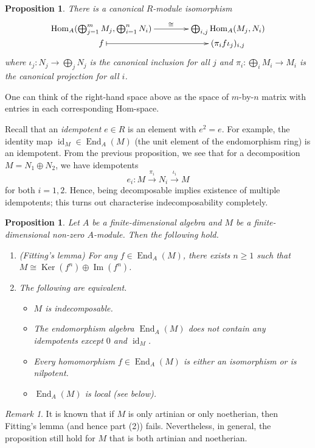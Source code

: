\documentclass[11pt,a4paper]{article}
\numberwithin{equation}{section}
\theoremstyle{all}
\newtheorem{proposition}[theorem]{Proposition}
\theoremstyle{remark}
\newtheorem{remark}[theorem]{Remark}
\newcommand{\id}{\operatorname{id}}
\newcommand{\Hom}{\operatorname{Hom}\nolimits}
\newcommand{\End}{\operatorname{End}\nolimits}
\renewcommand{\Im}{\operatorname{Im}\nolimits}
\newcommand{\Ker}{\operatorname{Ker}\nolimits}
\newcommand{\defn}[1]{\textsl{\color{darkblue} #1}}
\begin{document}
\begin{proposition}\label{prop:hom commute direct sum}
There is a canonical $R$-module isomorphism
\[
\xymatrix@C=40pt@R=0pt{\Hom_A(\bigoplus_{j=1}^m M_j, \bigoplus_{i=1}^n N_i) \ar[r]^(.55){\cong}& \bigoplus_{i,j}\Hom_A(M_j,N_i)\\
f \ar@{|->}[r]& (\pi_i f\iota_j)_{i,j}
}
\]
where $\iota_j:N_j\to \bigoplus_j N_j$ is the canonical inclusion for all $j$ and $\pi_i:\bigoplus_iM_i \to M_i$ is the canonical projection for all $i$.
\end{proposition}

One can think of the right-hand space above as the space of $m$-by-$n$ matrix with entries in each corresponding Hom-space.

Recall that an \defn{idempotent} $e\in R$ is an element with $e^2=e$.
For example, the identity map $\id_M\in \End_A(M)$ (the unit element of the endomorphism ring) is an idempotent. 
From the previous proposition, we see that for a decomposition $M=N_1\oplus N_2$, we have idempotents
\[
e_i : M\xrightarrow{\pi_i} N_i \xrightarrow{\iota_i} M
\]
for both $i=1,2$.
Hence, being decomposable implies existence of multiple idempotents; this turns out characterise indecomposability completely.

\begin{proposition}\label{prop:indec characterisations}
Let $A$ be a finite-dimensional algebra and $M$ be a finite-dimensional non-zero $A$-module.
Then the following hold.
\begin{enumerate}
\item (Fitting's lemma) For any $f\in \End_A(M)$, there exists $n\ge 1$ such that $M\cong \Ker(f^n)\oplus \Im(f^n)$.

\item The following are equivalent.
\begin{itemize}
\item $M$ is indecomposable.
\item The endomorphism algebra $\End_A(M)$ does not contain any idempotents except $0$ and $\id_M$.
\item Every homomorphism $f\in \End_A(M)$ is either an isomorphism or is nilpotent.
\item $\End_A(M)$ is \defn{local} (see below).
\end{itemize}
\end{enumerate}
\end{proposition}
\begin{remark}
It is known that if $M$ is only artinian or only noetherian, then Fitting's lemma (and hence part (2)) fails.
Nevertheless, in general, the proposition still hold for $M$ that is both artinian and noetherian.  
\end{remark}
\end{document}
